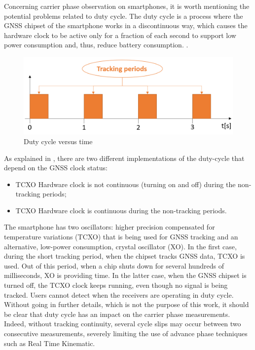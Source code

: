 Concerning carrier phase observation on smartphones, it is worth mentioning the potential problems related to duty cycle. The duty cycle is a process where the GNSS chipset of the smartphone works in a discontinuous way, which causes the hardware clock to be active only for a fraction of each second to support low power consumption and, thus, reduce battery consumption. \cite{Linty:2014}. 

\begin{figure}[htb] 
	\centering
	\includegraphics[scale=0.60]{fig/duty_cycle.png} 
	\caption{Duty cycle versus time}
	\label{FIG:duty_cycle} 
\end{figure}
As explained in \cite{GSA_wp:2016}, there are two different implementations of the duty-cycle that depend on the GNSS clock status:
\begin{itemize}
	\item TCXO Hardware clock is not continuous (turning on and off) during the non-tracking periods;
	\item TCXO Hardware clock is continuous during the non-tracking periods.
\end{itemize}
The smartphone has two oscillators: higher precision compensated for temperature variations (TCXO) that is being used for GNSS tracking and an alternative, low-power consumption, crystal oscillator (XO). In the first case, during the short tracking period, when the chipset tracks GNSS data, TCXO is used. 
Out of this period, when a chip shuts down for several hundreds of milliseconds, XO is providing time. In the latter case, when the GNSS chipset is turned off, the TCXO clock keeps running, even though no signal is being tracked. 
Users cannot detect when the receivers are operating in
duty cycle. Without going in further details, which is not the purpose of this work, it should be clear that duty cycle has
an impact on the carrier phase measurements. Indeed, without tracking continuity, several cycle slips may occur between two
consecutive measurements, severely limiting the use of  advance phase techniques such as Real Time Kinematic.


